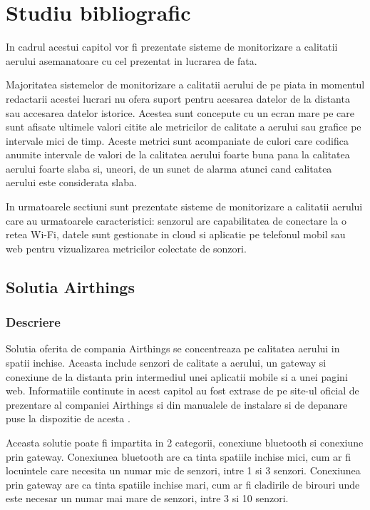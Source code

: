 \chapter{Studiu bibliografic}\label{ch:studiubib}

\pagestyle{fancy}

In cadrul acestui capitol vor fi prezentate sisteme de monitorizare a calitatii aerului asemanatoare cu cel prezentat in lucrarea de fata.

Majoritatea sistemelor de monitorizare a calitatii aerului de pe piata in momentul redactarii acestei lucrari nu ofera suport pentru acesarea datelor de 
la distanta sau accesarea datelor istorice. Acestea sunt concepute cu un ecran mare pe care sunt afisate ultimele valori citite ale metricilor de calitate a 
aerului sau grafice pe intervale mici de timp. Aceste metrici sunt acompaniate de culori care codifica anumite intervale de valori de la calitatea aerului 
foarte buna pana la calitatea aerului foarte slaba si, uneori, de un sunet de alarma atunci cand calitatea aerului este considerata slaba.

In urmatoarele sectiuni sunt prezentate sisteme de monitorizare a calitatii aerului care au urmatoarele caracteristici: senzorul are capabilitatea de conectare 
la o retea Wi-Fi, datele sunt gestionate in cloud si aplicatie pe telefonul mobil sau web pentru vizualizarea metricilor colectate de sonzori.

\section{Solutia Airthings}\label{sec:airthingsWavePlus}
\subsection{Descriere}\label{subsec:airthings_descriere}
Solutia oferita de compania Airthings se concentreaza pe calitatea aerului in spatii inchise. Aceasta include senzori de calitate a aerului, un gateway si conexiune 
de la distanta prin intermediul unei aplicatii mobile si a unei pagini web. Informatiile continute in acest capitol au fost extrase de pe site-ul oficial de 
prezentare al companiei Airthings si din manualele de instalare si de depanare puse la dispozitie de acesta \cite{airthings}.

Aceasta solutie poate fi impartita in 2 categorii, conexiune bluetooth si conexiune prin gateway. Conexiunea bluetooth are ca tinta spatiile inchise mici, 
cum ar fi locuintele care necesita un numar mic de senzori, intre 1 si 3 senzori. Conexiunea prin gateway are ca tinta spatiile inchise mari, cum ar fi cladirile de 
birouri unde este necesar un numar mai mare de senzori, intre 3 si 10 senzori.

